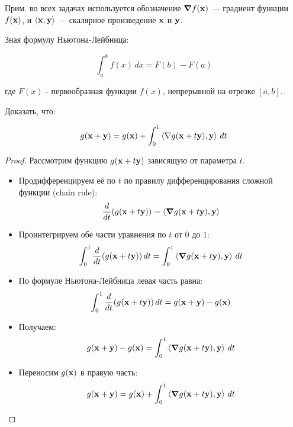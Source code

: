 
\renewcommand*{\proofname}{Доказательство}

Прим. во всех задачах используется обозначение $\grad{f(\vb x)}$ — градиент функции $f(\vb x)$,
и $\left\langle \vb x, \vb y \right\rangle$ — скалярное произведение $\vb x$ и $\vb y$.

\begin{problem}
Зная формулу Ньютона-Лейбница:

\[
    \int_{a}^{b} f(x) \, dx = F(b) - F(a)
\]

где $F(x)$ - первообразная функции $f(x)$, непрерывной на отрезке $[a, b]$.

Доказать, что:

\[
    g(\vb{x} + \vb{y}) = g(\vb{x}) + \int_{0}^{1} \left\langle  \nabla g(\vb{x} + t \vb{y}) , \vb{y}  \right\rangle\, dt
\]
\end{problem}


\begin{proof}
    Рассмотрим функцию $g(\vb{x} + t \vb{y})$ зависящую от параметра $t$.
    \begin{itemize}
        \item Продифференцируем её по $t$ по правилу дифференцирования сложной функции (chain rule):
              \[
                  \dv{t}(g(\vb{x} + t \vb{y})) = \left\langle  \grad{ g(\vb{x} + t \vb{y})} , \vb{y} \right\rangle
              \]

        \item Проинтегрируем обе части уравнения по $t$ от $0$ до $1$:
              \[
                  \int_{0}^{1} \dv{t} (g(\vb{x} + t \vb{y})) \, dt
                  = \int_{0}^{1} \left\langle  \grad {g(\vb{x} + t \vb{y}) }, \vb{y} \right\rangle \, dt
              \]
        \item По формуле Ньютона-Лейбница левая часть равна:
              \[
                  \int_{0}^{1} \dv{t} (g(\vb{x} + t \vb{y})) \, dt
                  = g(\vb{x} + \vb{y}) - g(\vb{x})
              \]
        \item Получаем:
              \[
                  g(\vb{x} + \vb{y}) - g(\vb{x})
                  = \int_{0}^{1} \left\langle \grad{g(\vb{x} + t \vb{y})}, \vb{y} \right\rangle \, dt
              \]
        \item Переносим $g(\vb{x})$ в правую часть:
              \[
                  g(\vb{x} + \vb{y})
                  = g(\vb{x}) + \int_{0}^{1} \left\langle \grad{g(\vb{x} + t \vb{y})} , \vb{y} \right\rangle \, dt
              \]

    \end{itemize}
\end{proof}


